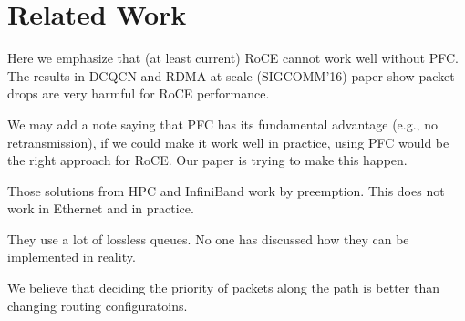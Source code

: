 \section{Related Work}\label{sec:related}

Here we emphasize that (at least current) RoCE cannot work well without PFC.
The results in DCQCN and RDMA at scale (SIGCOMM'16) paper show packet drops
are very harmful for RoCE performance.

We may add a note saying that PFC has its fundamental advantage (e.g., no retransmission),
if we could make it work well in practice, using PFC would be the right approach
for RoCE. Our paper is trying to make this happen.

 Those solutions from HPC and InfiniBand
work by preemption. This does not work in Ethernet and in practice.

 They use a lot of lossless queues. No one
has discussed how they can be implemented in reality.

We believe that deciding the priority of packets along the path is better than changing 
routing configuratoins.
